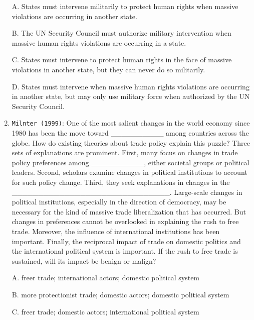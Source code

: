 \documentclass[
]{book}
\begin{document}
\begin{enumerate}
  A. States must intervene militarily to protect human rights when massive violations are occurring in another state.

  B. The UN Security Council must authorize military intervention when massive human rights violations are occurring in a state.

  C. States must intervene to protect human rights in the face of massive violations in another state, but they can never do so militarily.

  D. States must intervene when massive human rights violations are occurring in another state, but may only use military force when authorized by the UN Security Council.
\item
  \texttt{Milnter\ (1999)}: One of the most salient changes in the world economy since 1980 has been the move toward \_\_\_\_\_\_\_\_\_\_ among countries across the globe. How do existing theories about trade policy explain this puzzle? Three sets of explanations are prominent. First, many focus on changes in trade policy preferences among \_\_\_\_\_\_\_\_\_\_, either societal groups or political leaders. Second, scholars examine changes in political institutions to account for such policy change. Third, they seek explanations in changes in the \_\_\_\_\_\_\_\_\_\_\_\_\_\_\_\_\_\_\_\_\_\_\_\_\_\_\_\_\_\_. Large-scale changes in political institutions, especially in the direction of democracy, may be necessary for the kind of massive trade liberalization that has occurred. But changes in preferences cannot be overlooked in explaining the rush to free trade. Moreover, the influence of international institutions has been important. Finally, the reciprocal impact of trade on domestic politics and the international political system is important. If the rush to free trade is sustained, will its impact be benign or malign?

  A. freer trade; international actors; domestic political system

  B. more protectionist trade; domestic actors; domestic political system

  C. freer trade; domestic actors; international political system


\end{enumerate}
\end{document}
